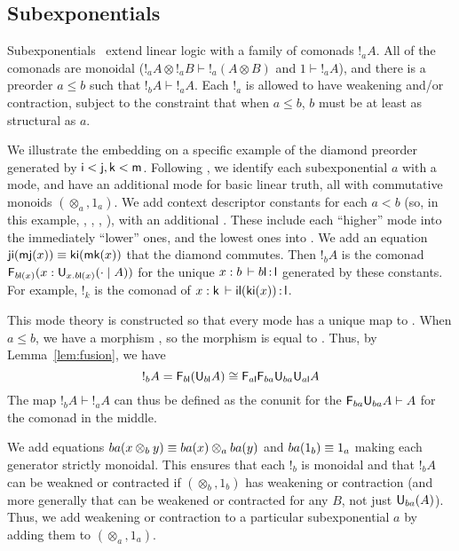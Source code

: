 \subsection{Subexponentials}

Subexponentials~\citep{danos+93subexponentials,nigammiller09subexponentials} extend linear logic with a family of
comonads $!_a A$.  All of the comonads are monoidal ($!_a A \otimes !_a
B \vdash !_a(A \otimes B)$ and $1 \vdash !_a A$), and there is a
preorder $a \le b$ such that $!_b A \vdash !_a A$.  Each $!_a$ is
allowed to have weakening and/or contraction, subject to the constraint
that when $a \le b$, $b$ must be at least as structural as $a$.

We illustrate the embedding on a specific example of the diamond
preorder generated by $\mathsf{i} < \mathsf{j},\mathsf{k} < \mathsf{m}$.  Following
\citep[Example 4.3]{reed09adjoint}, we identify each subexponential $a$
with a mode, and have an additional mode  for basic linear truth,
all with commutative monoids $(\otimes_a,1_a)$.  We add context
descriptor constants  for each $a < b$ (so, in
this example, , , , ), with an
additional .  These include each
``higher'' mode into the immediately ``lower'' ones, and the lowest ones
into .  We add an equation $\mathsf{ji}(\mathsf{mj}(x)) \equiv
\mathsf{ki}(\mathsf{mk}(x))$ that the diamond commutes.  Then $!_b A$ is the
comonad $\mathsf{F}_{b{\mathsf{l}}(x)}(x : \mathsf{U}_{x.b\mathsf{l}(x)}(\cdot \mid A))$ for the
unique $x : b \, \vdash b{\mathsf{l}} \, \mathit{:} \, \mathsf{l}$ generated by these constants.
For example, $!_k$ is the comonad of $x :
  \mathsf{k} \, \vdash \mathsf{il}(\mathsf{ki}(x)) \, \mathit{:} \, \mathsf{l}$.

This mode theory is constructed so that every mode has a unique map to
.  When $a \le b$, we have a morphism , so
the morphism  is equal to
.  Thus, by Lemma~\ref{lem:fusion},
we have
\[
!_b A = \mathsf{F}_{{b\mathsf{l}}}(\mathsf{U}_{{b\mathsf{l}}} A) \cong \mathsf{F}_{{a\mathsf{l}}}\mathsf{F}_{{ba}} \mathsf{U}_{{ba}} \mathsf{U}_{{a\mathsf{l}}} A
\]
The map $!_b A \vdash !_a A$ can thus be defined as the conunit for the
$\mathsf{F}_{{ba}} \mathsf{U}_{{ba}} A \vdash A$ for the comonad in the middle.

We add equations $ba(x \otimes_b y) \equiv ba(x) \otimes_a ba(y)$ and
$ba(1_b) \equiv 1_a$ making each generator strictly monoidal.  This
ensures that each $!_b$ is monoidal and that $!_b A$ can be weakned or
contracted if $(\otimes_b,1_b)$ has weakening or contraction (and more
generally that  can be weakened or contracted for any $B$, not
just $\mathsf{U}_{ba}{(A)}$).  Thus, we add weakening or contraction to
a particular subexponential $a$ by adding them to $(\otimes_a,1_a)$.


